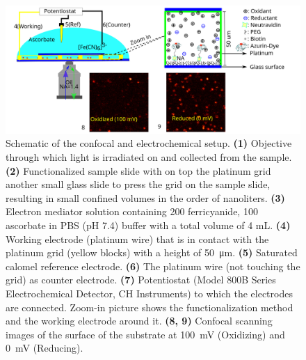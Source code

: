 \begin{figure}
	\centering
	\includegraphics[width=\textwidth]{Scheme_1_setup}
	\caption{Schematic of the confocal and electrochemical setup.
	\textbf{(1)} Objective through which light is irradiated on and collected from the sample.
	\textbf{(2)} Functionalized sample slide with on top the platinum grid another small glass slide to press the grid on the sample slide, resulting in small confined 
	volumes in the order of nanoliters.
	\textbf{(3)} Electron mediator solution containing \SI{200}{\uM} ferricyanide, \SI{100}{\uM} ascorbate in PBS (pH 7.4) buffer with a total volume of 4 mL.
	\textbf{(4)} Working electrode (platinum wire) that is in contact with the platinum grid (yellow blocks) with a height of \SI{50}{\um}.
	\textbf{(5)} Saturated calomel reference electrode.
	\textbf{(6)} The platinum wire (not touching the grid) as counter electrode.
	\textbf{(7)} Potentiostat (Model 800B Series Electrochemical Detector, CH Instruments) to which the electrodes are connected.
	Zoom-in picture shows the functionalization method and the working electrode around it. 
	\textbf{(8, 9)} Confocal scanning images of the surface of the substrate at \SI{100}{\mV} (Oxidizing) and \SI{0}{\mV} (Reducing).
	}
  	\label{sch:setup}
\end{figure}
